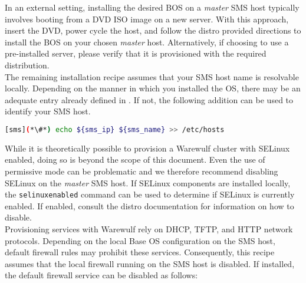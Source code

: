 In an external setting, installing the desired BOS on a {\em master} SMS host
typically involves booting from a DVD ISO image on a new server. With this
approach, insert the \baseOS{} DVD, power cycle the host, and follow the distro
provided directions to install the BOS on your chosen {\em master} host.
Alternatively, if choosing to use a pre-installed server, please verify that it
is provisioned with the required \baseOS{} distribution. \\

The remaining installation recipe assumes that your SMS host name is
resolvable locally. Depending on the manner in which you installed the OS,
there may be an adequate entry already defined in . If not,
the following addition can be used to identify your SMS host.
\begin{lstlisting}[language=bash]
[sms](*\#*) echo ${sms_ip} ${sms_name} >> /etc/hosts
\end{lstlisting}

While it is theoretically possible to provision a Warewulf cluster with SELinux
enabled, doing so is beyond the scope of this document. Even the use of
permissive mode can be problematic and we therefore recommend disabling SELinux on the {\em
master} SMS host. If SELinux components are installed locally,
the \texttt{selinuxenabled} command can be used to determine if SELinux is
currently enabled. If enabled, consult the distro documentation for information
on how to disable. \\

Provisioning services with Warewulf rely on DHCP, TFTP, and HTTP network protocols.
Depending on the local Base OS configuration on the SMS host, default firewall
rules may prohibit these services. Consequently, this recipe assumes that the local
firewall running on the SMS host is disabled. If installed, the default
firewall service can be disabled as follows:
